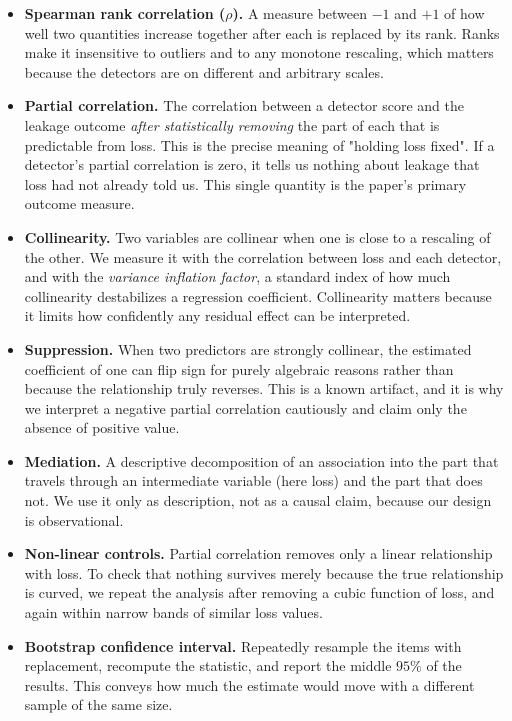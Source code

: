 \begin{itemize}
 \item \textbf{Spearman rank correlation ($\rho$).} A measure between $-1$ and $+1$ of
 how well two quantities increase together after each is replaced by its rank. Ranks make
 it insensitive to outliers and to any monotone rescaling, which matters because the
 detectors are on different and arbitrary scales.
 \item \textbf{Partial correlation.} The correlation between a detector score and the
 leakage outcome \emph{after statistically removing} the part of each that is predictable
 from loss. This is the precise meaning of "holding loss fixed". If a detector's partial
 correlation is zero, it tells us nothing about leakage that loss had not already told
 us. This single quantity is the paper's primary outcome measure.
 \item \textbf{Collinearity.} Two variables are collinear when one is close to a
 rescaling of the other. We measure it with the correlation between loss and each
 detector, and with the \emph{variance inflation factor}, a standard index of how much
 collinearity destabilizes a regression coefficient. Collinearity matters because it
 limits how confidently any residual effect can be interpreted.
 \item \textbf{Suppression.} When two predictors are strongly collinear, the estimated
 coefficient of one can flip sign for purely algebraic reasons rather than because the
 relationship truly reverses. This is a known artifact, and it is why we interpret a
 negative partial correlation cautiously and claim only the absence of positive value.
 \item \textbf{Mediation.} A descriptive decomposition of an association into the part
 that travels through an intermediate variable (here loss) and the part that does not. We
 use it only as description, not as a causal claim, because our design is observational.
 \item \textbf{Non-linear controls.} Partial correlation removes only a linear
 relationship with loss. To check that nothing survives merely because the true
 relationship is curved, we repeat the analysis after removing a cubic function of loss,
 and again within narrow bands of similar loss values.
 \item \textbf{Bootstrap confidence interval.} Repeatedly resample the items with
 replacement, recompute the statistic, and report the middle $95\%$ of the results. This
 conveys how much the estimate would move with a different sample of the same size.

\end{itemize}

